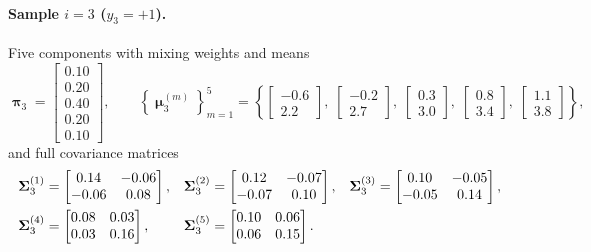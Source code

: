 \documentclass[11pt, letterpaper]{article}
\newcommand{\bSigma}{\vb{\Sigma}}
\newcommand{\bpi}{\boldsymbol{\uppi}}
\newcommand{\bmu}{\boldsymbol{\upmu}}
\begin{document}
\paragraph{Sample $i = 3$ ($y_3 = +1$).} Five components with mixing weights and means
\begin{equation}
    \bpi_3 = \begin{bmatrix} 0.10 \\ 0.20 \\ 0.40 \\ 0.20 \\ 0.10 \end{bmatrix},
    \qquad
    \left\{\bmu_3^{(m)}\right\}_{m=1}^{5} =
    \left\{
        \begin{bmatrix} -0.6 \\  2.2 \end{bmatrix},\;
        \begin{bmatrix} -0.2 \\  2.7 \end{bmatrix},\;
        \begin{bmatrix}  0.3 \\  3.0 \end{bmatrix},\;
        \begin{bmatrix}  0.8 \\  3.4 \end{bmatrix},\;
        \begin{bmatrix}  1.1 \\  3.8 \end{bmatrix}
    \right\},
\end{equation}
and full covariance matrices
\begin{align}
    \bSigma_3^{(1)} &= \begin{bmatrix} 0.14 & -0.06 \\ -0.06 & 0.08 \end{bmatrix}, &
    \bSigma_3^{(2)} &= \begin{bmatrix} 0.12 & -0.07 \\ -0.07 & 0.10 \end{bmatrix}, &
    \bSigma_3^{(3)} &= \begin{bmatrix} 0.10 & -0.05 \\ -0.05 & 0.14 \end{bmatrix}, \notag \\
    \bSigma_3^{(4)} &= \begin{bmatrix} 0.08 & 0.03 \\ 0.03 & 0.16 \end{bmatrix}, &
    \bSigma_3^{(5)} &= \begin{bmatrix} 0.10 & 0.06 \\ 0.06 & 0.15 \end{bmatrix}. &&
\end{align}
\end{document}
